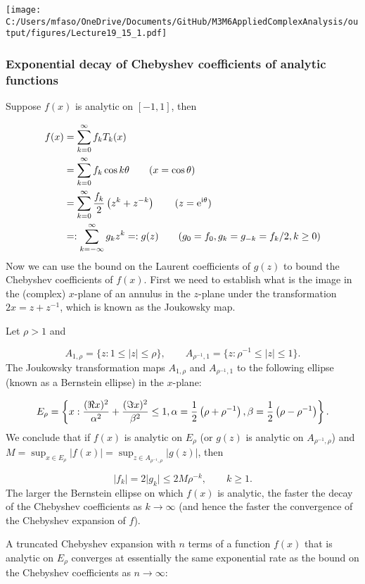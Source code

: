 \documentclass[12pt,a4paper]{article}
\def\I{ {\rm i} }
\def\E{ {\rm e} }
\begin{document}
\texttt{[image: C:/Users/mfaso/OneDrive/Documents/GitHub/M3M6AppliedComplexAnalysis/output/figures/Lecture19\_15\_1.pdf]}

\subsubsection{Exponential decay of Chebyshev coefficients of analytic functions}
Suppose $f(x)$ is analytic on $[-1, 1]$, then


\begin{align*}
f(x) & = \sum_{k = 0}^{\infty} f_k T_k(x) \\
     & =\sum_{k = 0}^{\infty} f_k \cos k\theta \qquad (x = \cos\theta) \\
     & = \sum_{k = 0}^{\infty} {f_k \over 2}\left( z^k + z^{-k}\right)  \qquad (z = \E^{\I \theta}) \\
     & =: \sum_{k = -\infty}^{\infty} g_k z^{k} =: g(z) \qquad (g_0 = f_0, g_{k} = g_{-k} = f_k/2, k\geq 0)
\end{align*}
Now we can use the bound on the Laurent coefficients of $g(z)$ to bound the Chebyshev coefficients of $f(x)$. First we need to establish what is the image in the (complex) $x$-plane of an annulus in the $z$-plane under the transformation $2x = z + z^{-1}$, which is known as the Joukowsky map.

Let $\rho > 1$ and

\[
A_{1,\rho} =  \lbrace z : 1 \leq \vert z \vert \leq \rho \rbrace, \qquad  A_{\rho^{-1},1} =  \lbrace z : \rho^{-1} \leq \vert z \vert \leq 1 \rbrace.
\]
The Joukowsky transformation maps $A_{1,\rho}$ and $A_{\rho^{-1},1}$ to the following ellipse (known as a Bernstein ellipse) in the $x$-plane:

\[
E_{\rho} = \left\lbrace x : {(\Re x)^2 \over \alpha^2} + {(\Im x)^2 \over \beta^2} \leq 1, \alpha = {1 \over 2}\left( \rho + \rho^{-1} \right),   \beta = {1 \over 2}\left( \rho - \rho^{-1} \right) \right\rbrace.
\]
We conclude that if $f(x)$ is analytic on $E_{\rho}$ (or $g(z)$ is analytic on $A_{\rho^{-1},\rho}$) and $M = \sup_{x \in  E_{\rho}} |f(x)| = \sup_{z \in  A_{\rho^{-1},\rho}} |g(z)|$, then

\[
\vert f_k \vert = 2 \vert g_k \vert \leq 2M\rho^{-k}, \qquad k \geq 1.
\]
The larger the Bernstein ellipse on which $f(x)$ is analytic, the faster the decay of the Chebyshev coefficients as $k \to \infty$ (and hence the faster the convergence of the Chebyshev expansion of $f$).

A truncated Chebyshev expansion with $n$ terms of a function $f(x)$ that is analytic on $E_{\rho}$ converges at essentially the same exponential rate as the bound on the Chebyshev coefficients as $n \to \infty$:
\end{document}
